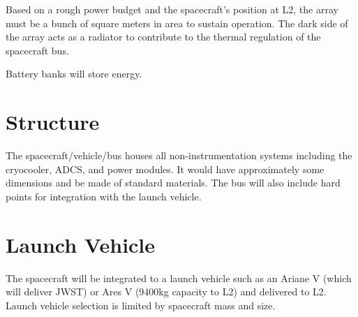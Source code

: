 \documentclass{ws-jai}
\begin{document}
Based on a rough power budget and the spacecraft's position at L2, the array must be a bunch of square meters in area to sustain operation.
The dark side of the array acts as a radiator to contribute to the thermal regulation of the spacecraft bus.

Battery banks will store energy.

\section{Structure}
\label{S:bus}
The spacecraft/vehicle/bus houses all non-instrumentation systems including the cryocooler, ADCS, and power modules.
It would have approximately some dimensions and be made of standard materials.
The bus will also include hard points for integration with the launch vehicle.

\section{Launch Vehicle}
\label{sS:launch}
The spacecraft will be integrated to a launch vehicle such as an Ariane V (which will deliver JWST) or Ares V (9400kg capacity to L2) and delivered to L2.
Launch vehicle selection is limited by spacecraft mass and size.
\end{document}
